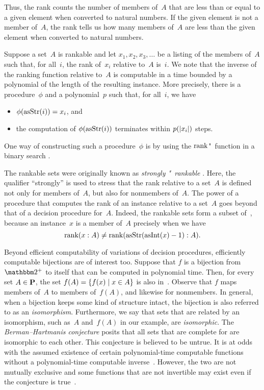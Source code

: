 Thus, the rank counts the number of members of~$A$ that are less than or equal to a given element when converted to natural numbers.
If the given element is not a member of~$A$, the rank tells us how many members of~$A$ are less than the given element when converted to natural numbers.

Suppose a set~$A$ is \pdash{}rankable and let $x_1, x_2, x_3, \ldots$ be a listing of the members of~$A$ such that, for all~$i$, the rank of~$x_i$ relative to~$A$ is~$i$.
We note that the inverse of the ranking function relative to~$A$ is computable in a time bounded by a polynomial of the length of the resulting instance.
More precisely, there is a procedure~$\phi$ and a polynomial~$p$ such that, for all~$i$, we have
\begin{itemize}
\item $\phi(\operatorname{asStr}(i)) = x_i$, and
\item the computation of $\phi(\operatorname{asStr}(i))$ terminates within $p({\lvert x_i\rvert})$ steps.
\end{itemize}
One way of constructing such a procedure~$\phi$ is by using the $\operatorname{rank}$"~function in a binary search \parencite[Theorem~6.1]{hemachandra1990complexity}.

The \pdash{}rankable sets were originally known as \emph{strongly "~rankable} \parencite{hemachandra1990complexity,goldberg1991compression}.
Here, the qualifier \enquote{strongly} is used to stress that the rank relative to a set~$A$ is defined not only for members of~$A$, but also for nonmembers of~$A$.
The power of a procedure that computes the rank of an instance relative to a set~$A$ goes beyond that of a decision procedure for~$A$.
Indeed, the \pdash{}rankable sets form a subset of~, because an instance~$x$ is a member of~$A$ precisely when we have
\begin{equation*}
  \operatorname{rank}(x : A) \ne \operatorname{rank}(\operatorname{asStr}(\operatorname{asInt}(x) - 1) : A).
\end{equation*}

Beyond efficient computability of variations of decision procedures, efficiently computable bijections are of interest too.
Suppose that $f$ is a bijection from~$\binary^+$ to itself that can be computed in polynomial time.
Then, for every set $A \in \textnormal{\textbf{P}}$, the set $f(A) = \{f(x) \;|\; x \in A\}$ is also in~.
Observe that $f$ maps members of~$A$ to members of~$f(A)$, and likewise for nonmembers.
In general, when a bijection keeps some kind of structure intact, the bijection is also referred to as an \emph{isomorphism}.
Furthermore, we say that sets that are related by an isomorphism, such as~$A$ and~$f(A)$ in our example, are \emph{isomorphic}.
The \emph{Berman--Hartmanis conjecture} \parencite{berman1977isomorphisms} posits that all sets that are complete for  are isomorphic to each other.
This conjecture is believed to be untrue.
It is at odds with the assumed existence of certain polynomial-time computable functions without a polynomial-time computable inverse~\parencite{young1983some,kurtz1989isomorphism}.
However, the two are not mutually exclusive and some functions that are not invertible may exist even if the conjecture is true~\parencite{hartmanis1991one,agrawal2009one}.

